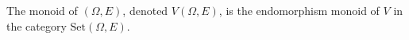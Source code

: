 The monoid of $(\Omega, E)$, denoted $V(\Omega, E)$, is the endomorphism monoid of $V$ in the category $\text{Set}(\Omega, E)$.
